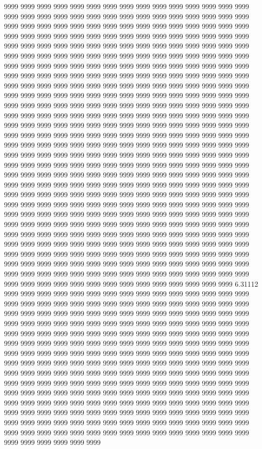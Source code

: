 9999 9999 9999 9999 9999 9999 9999 9999 9999 9999 9999 9999 9999 9999 9999 9999 9999 9999 9999 9999 9999 9999 9999 9999 9999 9999 9999 9999 9999 9999 9999 9999 9999 9999 9999 9999 9999 9999 9999 9999 9999 9999 9999 9999 9999 9999 9999 9999 9999 9999 9999 9999 9999 9999 9999 9999 9999 9999 9999 9999 9999 9999 9999 9999 9999 9999 9999 9999 9999 9999 9999 9999 9999 9999 9999 9999 9999 9999 9999 9999 9999 9999 9999 9999 9999 9999 9999 9999 9999 9999 9999 9999 9999 9999 9999 9999 9999 9999 9999 9999 9999 9999 9999 9999 9999 9999 9999 9999 9999 9999 9999 9999 9999 9999 9999 9999 9999 9999 9999 9999 9999 9999 9999 9999 9999 9999 9999 9999 9999 9999 9999 9999 9999 9999 9999 9999 9999 9999 9999 9999 9999 9999 9999 9999 9999 9999 9999 9999 9999 9999 9999 9999 9999 9999 9999 9999 9999 9999 9999 9999 9999 9999 9999 9999 9999 9999 9999 9999 9999 9999 9999 9999 9999 9999 9999 9999 9999 9999 9999 9999 9999 9999 9999 9999 9999 9999 9999 9999 9999 9999 9999 9999 9999 9999 9999 9999 9999 9999 9999 9999 9999 9999 9999 9999 9999 9999 9999 9999 9999 9999 9999 9999 9999 9999 9999 9999 9999 9999 9999 9999 9999 9999 9999 9999 9999 9999 9999 9999 9999 9999 9999 9999 9999 9999 9999 9999 9999 9999 9999 9999 9999 9999 9999 9999 9999 9999 9999 9999 9999 9999 9999 9999 9999 9999 9999 9999 9999 9999 9999 9999 9999 9999 9999 9999 9999 9999 9999 9999 9999 9999 9999 9999 9999 9999 9999 9999 9999 9999 9999 9999 9999 9999 9999 9999 9999 9999 9999 9999 9999 9999 9999 9999 9999 9999 9999 9999 9999 9999 9999 9999 9999 9999 9999 9999 9999 9999 9999 9999 9999 9999 9999 9999 9999 9999 9999 9999 9999 9999 9999 9999 9999 9999 9999 9999 9999 9999 9999 9999 9999 9999 9999 9999 9999 9999 9999 9999 9999 9999 9999 9999 9999 9999 9999 9999 9999 9999 9999 9999 9999 9999 9999 9999 9999 9999 9999 9999 9999 9999 9999 9999 9999 9999 9999 9999 9999 9999 9999 9999 9999 9999 9999 9999 9999 9999 9999 9999 9999 9999 9999 9999 9999 9999 9999 9999 9999 9999 9999 9999 9999 9999 9999 9999 9999 9999 9999 9999 9999 9999 9999 9999 9999 9999 9999 9999 9999 9999 9999 9999 9999 9999 9999 9999 9999 9999 9999 9999 9999 9999 9999 9999 9999 9999 9999 9999 9999 9999 9999 9999 9999 9999 9999 9999 9999 9999 6.31112 9999 9999 9999 9999 9999 9999 9999 9999 9999 9999 9999 9999 9999 9999 9999 9999 9999 9999 9999 9999 9999 9999 9999 9999 9999 9999 9999 9999 9999 9999 9999 9999 9999 9999 9999 9999 9999 9999 9999 9999 9999 9999 9999 9999 9999 9999 9999 9999 9999 9999 9999 9999 9999 9999 9999 9999 9999 9999 9999 9999 9999 9999 9999 9999 9999 9999 9999 9999 9999 9999 9999 9999 9999 9999 9999 9999 9999 9999 9999 9999 9999 9999 9999 9999 9999 9999 9999 9999 9999 9999 9999 9999 9999 9999 9999 9999 9999 9999 9999 9999 9999 9999 9999 9999 9999 9999 9999 9999 9999 9999 9999 9999 9999 9999 9999 9999 9999 9999 9999 9999 9999 9999 9999 9999 9999 9999 9999 9999 9999 9999 9999 9999 9999 9999 9999 9999 9999 9999 9999 9999 9999 9999 9999 9999 9999 9999 9999 9999 9999 9999 9999 9999 9999 9999 9999 9999 9999 9999 9999 9999 9999 9999 9999 9999 9999 9999 9999 9999 9999 9999 9999 9999 9999 9999 9999 9999 9999 9999 9999 9999 9999 9999 9999 9999 9999 9999 9999 9999 9999 9999 9999 9999 9999 9999 9999 9999 9999 9999 9999 9999 9999 9999 9999 9999 9999 9999 9999 9999 9999 9999 9999 9999 9999 9999 9999 9999 9999 9999 9999 9999 9999 9999 9999 9999 9999 9999 9999 9999 9999 9999 9999 